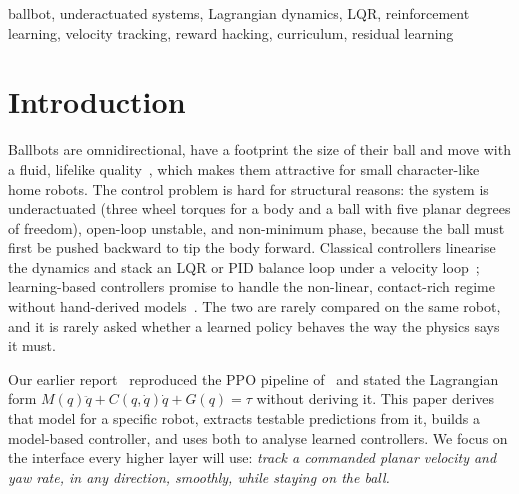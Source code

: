 \documentclass[conference]{IEEEtran}
\theoremstyle{remark}
\begin{document}
\begin{IEEEkeywords}
ballbot, underactuated systems, Lagrangian dynamics, LQR, reinforcement learning, velocity tracking, reward hacking, curriculum, residual learning
\end{IEEEkeywords}

\section{Introduction}
Ballbots are omnidirectional, have a footprint the size of their ball and move with a fluid, lifelike quality~\cite{lauwers2006,nagarajan2014}, which makes them attractive for small character-like home robots. The control problem is hard for structural reasons: the system is underactuated (three wheel torques for a body and a ball with five planar degrees of freedom), open-loop unstable, and non-minimum phase, because the ball must first be pushed backward to tip the body forward. Classical controllers linearise the dynamics and stack an LQR or PID balance loop under a velocity loop~\cite{nagarajan2014,fankhauser2010,abdelrahim2025}; learning-based controllers promise to handle the non-linear, contact-rich regime without hand-derived models~\cite{zhou2022,salehi2025}. The two are rarely compared on the same robot, and it is rarely asked whether a learned policy behaves the way the physics says it must.

Our earlier report~\cite{tadesse2025report} reproduced the PPO pipeline of~\cite{salehi2025} and stated the Lagrangian form $M(q)\ddot q+C(q,\dot q)\dot q+G(q)=\tau$ without deriving it. This paper derives that model for a specific robot, extracts testable predictions from it, builds a model-based controller, and uses both to analyse learned controllers. We focus on the interface every higher layer will use: \emph{track a commanded planar velocity and yaw rate, in any direction, smoothly, while staying on the ball.}
\end{document}
